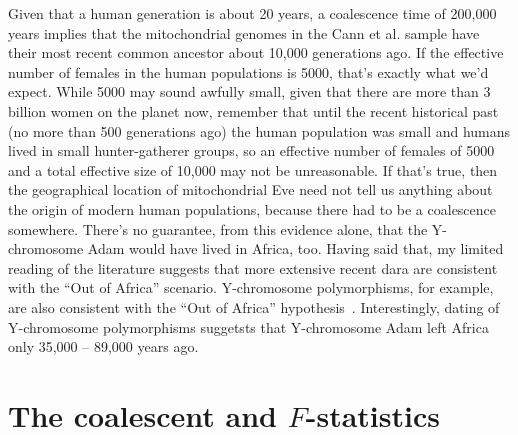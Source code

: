 Given that a human generation is about 20 years, a coalescence time of
200,000 years implies that the mitochondrial genomes in the Cann et
al. sample have their most recent common ancestor about 10,000
generations ago. If the effective number of females in the human
populations is 5000, that's exactly what we'd expect. While 5000 may
sound awfully small, given that there are more than 3 billion women on
the planet now, remember that until the recent historical past (no
more than 500 generations ago) the human population was small and
humans lived in small hunter-gatherer groups, so an effective number
of females of 5000 and a total effective size of 10,000 may not be
unreasonable. If that's true, then the geographical location of
mitochondrial Eve need not tell us anything about the origin of modern
human populations, because there had to be a coalescence
somewhere. There's no guarantee, from this evidence alone, that the
Y-chromosome Adam would have lived in Africa, too. Having said that,
my limited reading of the literature suggests that more extensive
recent dara are consistent with the ``Out of Africa''
scenario. Y-chromosome polymorphisms, for example, are also consistent
with the ``Out of Africa''
hypothesis~\cite{Underhill-etal-2000}. Interestingly, dating of
Y-chromosome polymorphisms suggetsts that Y-chromosome Adam left
Africa only 35,000 -- 89,000 years ago.

\section*{The coalescent and $F$-statistics}

